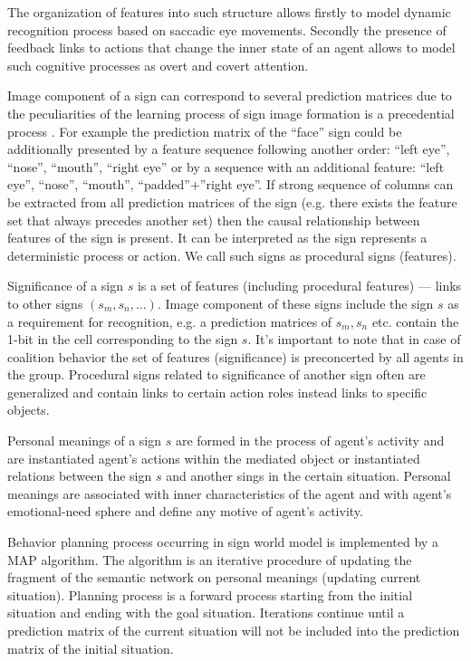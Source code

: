 \documentclass[procedia]{easychair}
\begin{document}
The organization of features into such structure allows firstly to model dynamic recognition process based on saccadic eye movements. Secondly the presence of feedback links to actions that change the inner state of an agent allows to model such cognitive processes as overt and covert attention.

Image component of a sign can correspond to several prediction matrices due to the peculiarities of the learning process of sign image formation is a precedential process \cite{Skrynnik2016}. For example the prediction matrix of the ``face'' sign could be additionally presented by a feature sequence following another order: ``left eye'', ``nose'', ``mouth'', ``right eye'' or by a sequence with an additional feature: ``left eye'', ``nose'', ``mouth'', ``padded''+''right eye''. If strong sequence of columns can be extracted from all prediction matrices of the sign (e.g. there exists the feature set that always precedes another set) then the causal relationship between features of the sign is present. It can be interpreted as the sign represents a deterministic process or action. We call such signs as procedural signs (features).

Significance of a sign $s$ is a set of features (including procedural features) --- links to other signs $(s_m, s_n, \dots)$. Image component of these signs include the sign $s$ as a requirement for recognition, e.g. a prediction matrices of $s_m, s_n$ etc. contain the 1-bit in the cell corresponding to the sign $s$. It's important to note that in case of coalition behavior the set of features (significance) is preconcerted by all agents in the group. Procedural signs related to significance of another sign often are generalized and contain links to certain action roles instead links to specific objects.

Personal meanings of a sign $s$ are formed in the process of agent's activity and are instantiated agent's actions within the mediated object or instantiated relations between the sign $s$ and another sings in the certain situation. Personal meanings are associated with inner characteristics of the agent and with agent's emotional-need sphere and define any motive of agent's activity.

Behavior planning process occurring in sign world model is implemented by a MAP algorithm. The algorithm is an iterative procedure of updating the fragment of the semantic network on personal meanings (updating current situation). Planning process is a forward process starting from the initial situation and ending with the goal situation. Iterations continue until a prediction matrix of the current situation will not be included into the prediction matrix of the initial situation. 
\end{document}
